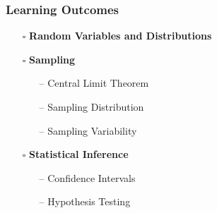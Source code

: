 \documentclass[handout]{beamer}
\begin{document}
\begin{frame}
    \frametitle{Learning Outcomes}
    \begin{itemize}
        \item[$\square$] \textbf{Random Variables and Distributions}
        \vspace{15pt}
        \item[$\square$] \textbf{Sampling} \\
        \begin{itemize}
            \item[--] Central Limit Theorem
            \item[--] Sampling Distribution
            \item[--] Sampling Variability
        \end{itemize}
        \vspace{5pt}
        \item[$\square$] \textbf{Statistical Inference} \\
        \begin{itemize}
            \item[--] Confidence Intervals
            \item[--] Hypothesis Testing
        \end{itemize}
    \end{itemize}
    \vspace*{\fill}
\end{frame}
\end{document}
